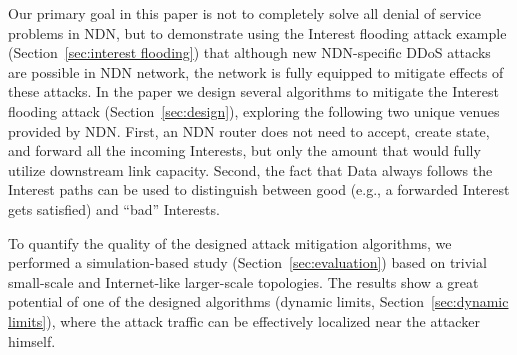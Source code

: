 Our primary goal in this paper is not to completely solve all denial of service problems in NDN, but to demonstrate using the Interest flooding attack example (Section~\ref{sec:interest flooding}) that although new NDN-specific DDoS attacks are possible in NDN network, the network is fully equipped to mitigate effects of these attacks.
In the paper we design several algorithms to mitigate the Interest flooding attack (Section~\ref{sec:design}), exploring the following two unique venues provided by NDN.
First, an NDN router does not need to accept, create state, and forward all the incoming Interests, but only the amount that would fully utilize downstream link capacity.
Second, the fact that Data always follows the Interest paths can be used to distinguish between good (e.g., a forwarded Interest gets satisfied) and ``bad'' Interests. 

To quantify the quality of the designed attack mitigation algorithms, we performed a simulation-based study (Section~\ref{sec:evaluation}) based on trivial small-scale and Internet-like larger-scale topologies.
The results show a great potential of one of the designed algorithms (dynamic limits, Section~\ref{sec:dynamic limits}), where the attack traffic can be effectively localized near the attacker himself.










